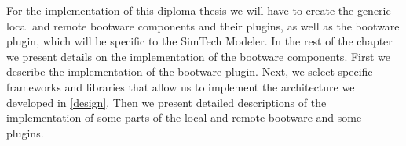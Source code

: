 For the implementation of this diploma thesis we will have to create the generic local and remote bootware components and their plugins, as well as the bootware plugin, which will be specific to the SimTech Modeler.
In the rest of the chapter we present details on the implementation of the bootware components.
First we describe the implementation of the bootware plugin.
Next, we select specific frameworks and libraries that allow us to implement the architecture we developed in \autoref{design}.
Then we present detailed descriptions of the implementation of some parts of the local and remote bootware and some plugins.
